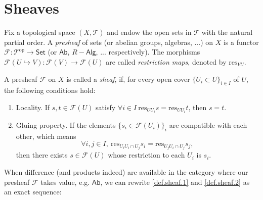 \section{Sheaves}

\newcommand{\etale}{étale }

\begin{definition}
Fix a topological space $(X,\mathcal{T})$ and endow the open sets in $\mathcal{T}$ with the natural partial order. A \emph{presheaf} of sets (or abelian groups, algebras, ...) on $X$ is a functor $\mathcal{F}:\mathcal{T}^\mathrm{op}\to\mathsf{Set}$ (or $\mathsf{Ab}$, $R-\mathsf{Alg}$, ... respectively). 
The morphisms $\mathcal{F}(U\hookrightarrow V):\mathcal{F}(V)\to\mathcal{F}(U)$ are called \emph{restriction maps}, denoted by $\mathrm{res}_{VU}$. 
\end{definition}

\begin{definition}
A presheaf $\mathcal{F}$ on $X$ is called a \emph{sheaf}, if, for every open cover $\{U_i\subset U\}_{i\in I}$ of $U$, the following conditions hold:
\begin{enumerate}[label=S.\arabic*, series=sheaf]
    \item\label{def.sheaf.1} Locality. If $s, t\in\mathcal{F}(U)$ satisfy $\forall i\in I\ \mathrm{res}_{UU_i}s=\mathrm{res}_{UU_i}t$, then $s=t$.
    \item\label{def.sheaf.2} Gluing property. If the elements $\{s_i\in\mathcal{F}(U_i)\}_i$ are compatible with each other, which means 
    $$\forall i,j\in I,\ \mathrm{res}_{U_iU_i\cap U_j}s_i=\mathrm{res}_{U_jU_i\cap U_j}s_j,$$
    then there exists $s\in\mathcal{F}(U)$ whose restriction to each $U_i$ is $s_i$.
\end{enumerate}
\end{definition}

When difference (and products indeed) are available in the category where our presheaf $\mathcal{F}$ takes value, e.g. $\mathsf{Ab}$, we can rewrite \ref{def.sheaf.1} and \ref{def.sheaf.2} as an exact sequence:


